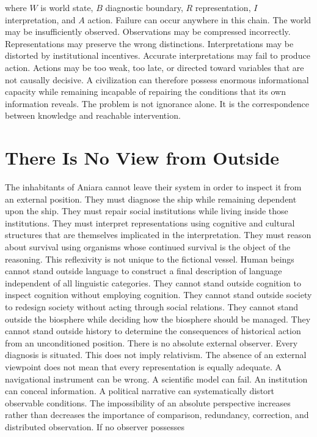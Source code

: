 \documentclass[11pt,oneside]{book}
\theoremstyle{definition}
\theoremstyle{remark}
\begin{document}
where \(W\) is world state, \(B\) diagnostic boundary, \(R\) representation, \(I\) interpretation,
and \(A\) action. Failure can occur anywhere in this chain. The world may be insufficiently
observed. Observations may be compressed incorrectly. Representations may preserve the wrong
distinctions. Interpretations may be distorted by institutional incentives. Accurate interpretations
may fail to produce action. Actions may be too weak, too late, or directed toward variables that are
not causally decisive. A civilization can therefore possess enormous informational capacity while
remaining incapable of repairing the conditions that its own information reveals. The problem is not
ignorance alone. It is the correspondence between knowledge and reachable intervention.

\section*{There Is No View from Outside}

The inhabitants of Aniara cannot leave their system in order to inspect it from an external
position. They must diagnose the ship while remaining dependent upon the ship. They must repair
social institutions while living inside those institutions. They must interpret representations
using cognitive and cultural structures that are themselves implicated in the interpretation. They
must reason about survival using organisms whose continued survival is the object of the reasoning.
This reflexivity is not unique to the fictional vessel. Human beings cannot stand outside language
to construct a final description of language independent of all linguistic categories. They cannot
stand outside cognition to inspect cognition without employing cognition. They cannot stand outside
society to redesign society without acting through social relations. They cannot stand outside the
biosphere while deciding how the biosphere should be managed. They cannot stand outside history to
determine the consequences of historical action from an unconditioned position. There is no absolute
external observer. Every diagnosis is situated. This does not imply relativism. The absence of an
external viewpoint does not mean that every representation is equally adequate. A navigational
instrument can be wrong. A scientific model can fail. An institution can conceal information. A
political narrative can systematically distort observable conditions. The impossibility of an
absolute perspective increases rather than decreases the importance of comparison, redundancy,
correction, and distributed observation. If no observer possesses
\end{document}

